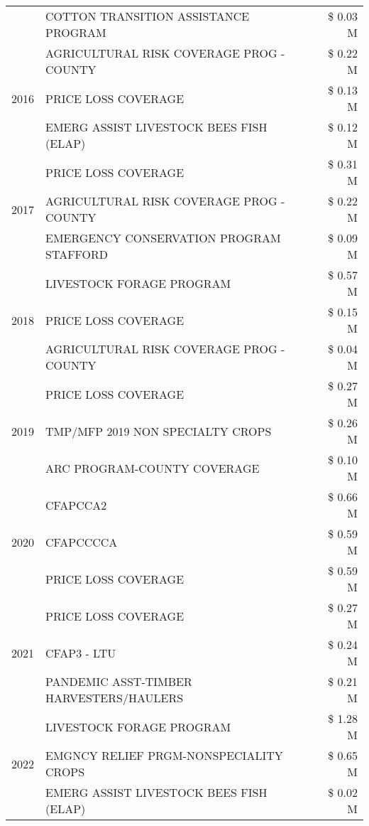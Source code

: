 \begin{tabular}{llr}
 & COTTON TRANSITION ASSISTANCE PROGRAM & \$ 0.03 M \\
\cline{1-3}
\multirow[t]{3}{*}{2016} & AGRICULTURAL RISK COVERAGE PROG - COUNTY & \$ 0.22 M \\
 & PRICE LOSS COVERAGE & \$ 0.13 M \\
 & EMERG ASSIST LIVESTOCK BEES FISH (ELAP) & \$ 0.12 M \\
\cline{1-3}
\multirow[t]{3}{*}{2017} & PRICE LOSS COVERAGE & \$ 0.31 M \\
 & AGRICULTURAL RISK COVERAGE PROG - COUNTY & \$ 0.22 M \\
 & EMERGENCY CONSERVATION PROGRAM STAFFORD & \$ 0.09 M \\
\cline{1-3}
\multirow[t]{3}{*}{2018} & LIVESTOCK FORAGE PROGRAM & \$ 0.57 M \\
 & PRICE LOSS COVERAGE & \$ 0.15 M \\
 & AGRICULTURAL RISK COVERAGE PROG - COUNTY & \$ 0.04 M \\
\cline{1-3}
\multirow[t]{3}{*}{2019} & PRICE LOSS COVERAGE & \$ 0.27 M \\
 & TMP/MFP 2019 NON SPECIALTY CROPS & \$ 0.26 M \\
 & ARC PROGRAM-COUNTY COVERAGE & \$ 0.10 M \\
\cline{1-3}
\multirow[t]{3}{*}{2020} & CFAPCCA2 & \$ 0.66 M \\
 & CFAPCCCCA & \$ 0.59 M \\
 & PRICE LOSS COVERAGE & \$ 0.59 M \\
\cline{1-3}
\multirow[t]{3}{*}{2021} & PRICE LOSS COVERAGE & \$ 0.27 M \\
 & CFAP3 - LTU & \$ 0.24 M \\
 & PANDEMIC ASST-TIMBER HARVESTERS/HAULERS & \$ 0.21 M \\
\cline{1-3}
\multirow[t]{3}{*}{2022} & LIVESTOCK FORAGE PROGRAM & \$ 1.28 M \\
 & EMGNCY RELIEF PRGM-NONSPECIALITY CROPS & \$ 0.65 M \\
 & EMERG ASSIST LIVESTOCK BEES FISH (ELAP) & \$ 0.02 M \\
\cline{1-3}
\bottomrule
\end{tabular}
